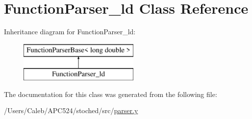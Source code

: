 \hypertarget{class_function_parser__ld}{}\section{Function\+Parser\+\_\+ld Class Reference}
\label{class_function_parser__ld}
Inheritance diagram for Function\+Parser\+\_\+ld\+:\begin{figure}[H]
\begin{center}
\leavevmode
\includegraphics[height=2.000000cm]{class_function_parser__ld}
\end{center}
\end{figure}


The documentation for this class was generated from the following file\+:\begin{DoxyCompactItemize}
\item 
/\+Users/\+Caleb/\+A\+P\+C524/stoched/src/\hyperlink{parser_8y}{parser.\+y}\end{DoxyCompactItemize}
